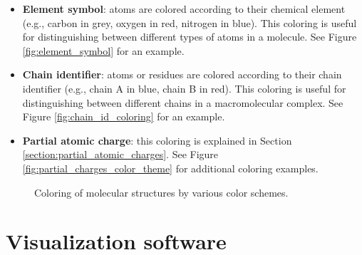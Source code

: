 \documentclass[
  digital,     %
  oneside,     %
  nosansbold,  %
  nocolorbold, %
  lof,         %
  lot,         %
]{fithesis4}
\begin{document}
\begin{itemize}
  \item \textbf{Element symbol}: atoms are colored according to their chemical element (e.g., carbon in grey, oxygen in red, nitrogen in blue). This coloring is useful for distinguishing between different types of atoms in a molecule. See Figure \ref{fig:element_symbol} for an example.
  \item \textbf{Chain identifier}: atoms or residues are colored according to their chain identifier (e.g., chain A in blue, chain B in red). This coloring is useful for distinguishing between different chains in a macromolecular complex. See Figure \ref{fig:chain_id_coloring} for an example.
  \item \textbf{Partial atomic charge}: this coloring is explained in Section \ref{section:partial_atomic_charges}. See Figure \ref{fig:partial_charges_color_theme} for additional coloring examples.
\end{itemize}

\begin{figure}[htbp]
  \centering
  \caption{Coloring of molecular structures by various color schemes.}
  \label{fig:coloring}
\end{figure}

\section{Visualization software}
\label{section:visualization_software}
\end{document}
